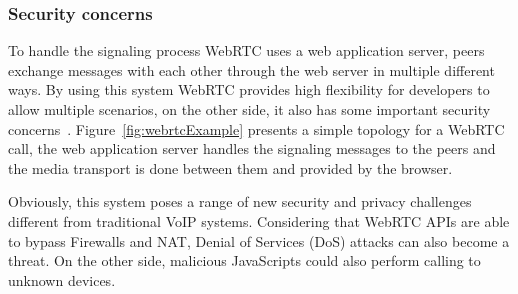 %
%
%

\subsubsection{Security concerns}

To handle the signaling process WebRTC uses a web application server, peers exchange messages with each other through the web server in multiple different ways. By using this system WebRTC provides high flexibility for developers to allow multiple scenarios, on the other side, it also has some important security concerns~\cite{WebRTCcasesIETF}. Figure~\ref{fig:webrtcExample} presents a simple topology for a WebRTC call, the web application server handles the signaling messages to the peers and the media transport is done between them and provided by the browser.

Obviously, this system poses a range of new security and privacy challenges different from traditional VoIP systems. Considering that WebRTC APIs are able to bypass Firewalls and NAT, Denial of Services (DoS)  attacks can also become a threat. On the other side, malicious JavaScripts could also perform calling to unknown devices.

